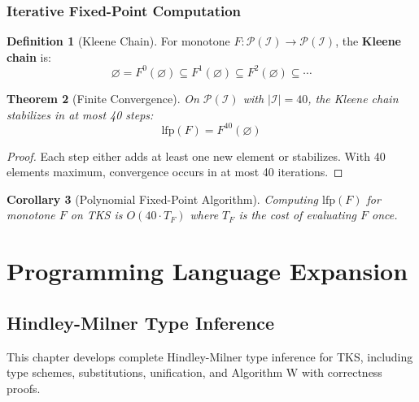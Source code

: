 \documentclass[11pt,twoside,openright]{book}
\theoremstyle{definition}
\newtheorem{definition}{Definition}[chapter]
\theoremstyle{plain}
\newtheorem{theorem}[definition]{Theorem}
\newtheorem{corollary}[definition]{Corollary}
\theoremstyle{remark}
\newcommand{\Ideas}{\mathcal{I}}
\newcommand{\vnewtwo}{\textbf{v7.2 New}}
\begin{document}
\section{Iterative Fixed-Point Computation}

\begin{definition}[Kleene Chain]
\label{def:kleene-chain}
For monotone $F : \mathcal{P}(\Ideas) \to \mathcal{P}(\Ideas)$, the \textbf{Kleene chain} is:
\[
\varnothing = F^0(\varnothing) \subseteq F^1(\varnothing) \subseteq F^2(\varnothing) \subseteq \cdots
\]
\end{definition}

\begin{theorem}[Finite Convergence]
\label{thm:finite-convergence}
On $\mathcal{P}(\Ideas)$ with $|\Ideas| = 40$, the Kleene chain stabilizes in at most 40 steps:
\[
\mathrm{lfp}(F) = F^{40}(\varnothing)
\]
\end{theorem}

\begin{proof}
Each step either adds at least one new element or stabilizes. With 40 elements maximum, convergence occurs in at most 40 iterations.
\end{proof}

\begin{corollary}[Polynomial Fixed-Point Algorithm]
\label{cor:poly-fixed-point}
Computing $\mathrm{lfp}(F)$ for monotone $F$ on TKS is $O(40 \cdot T_F)$ where $T_F$ is the cost of evaluating $F$ once.
\end{corollary}

\part{Programming Language Expansion}

\chapter{Hindley-Milner Type Inference}
\label{ch:algorithm-w}

\begin{tcolorbox}[colback=blue!5!white,colframe=blue!75!black,title=\vnewtwo]
This chapter develops complete Hindley-Milner type inference for TKS, including type schemes, substitutions, unification, and Algorithm W with correctness proofs.
\end{tcolorbox}
\end{document}
